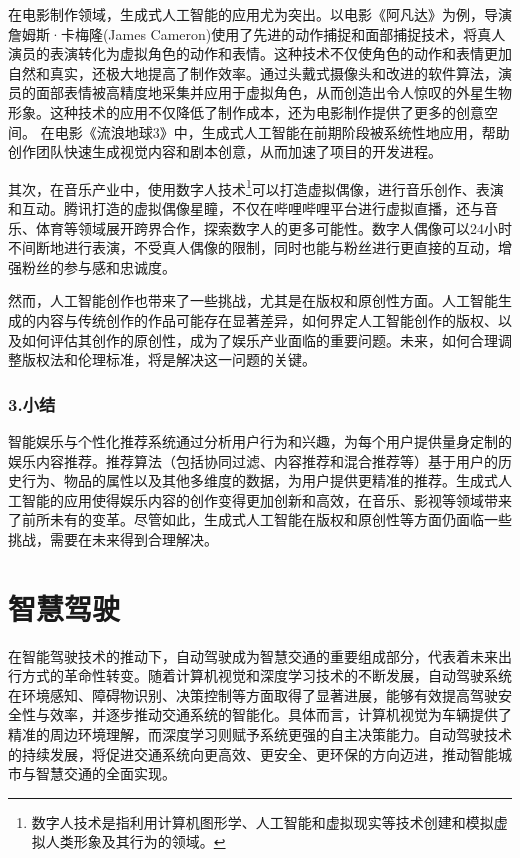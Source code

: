 在电影制作领域，生成式人工智能的应用尤为突出。以电影《阿凡达》为例，导演詹姆斯·卡梅隆(James Cameron)使用了先进的动作捕捉和面部捕捉技术，将真人演员的表演转化为虚拟角色的动作和表情。这种技术不仅使角色的动作和表情更加自然和真实，还极大地提高了制作效率。通过头戴式摄像头和改进的软件算法，演员的面部表情被高精度地采集并应用于虚拟角色，从而创造出令人惊叹的外星生物形象。这种技术的应用不仅降低了制作成本，还为电影制作提供了更多的创意空间。
在电影《流浪地球3》中，生成式人工智能在前期阶段被系统性地应用，帮助创作团队快速生成视觉内容和剧本创意，从而加速了项目的开发进程。

其次，在音乐产业中，使用数字人技术\footnote{数字人技术是指利用计算机图形学、人工智能和虚拟现实等技术创建和模拟虚拟人类形象及其行为的领域。}可以打造虚拟偶像，进行音乐创作、表演和互动。腾讯打造的虚拟偶像星瞳，不仅在哔哩哔哩平台进行虚拟直播，还与音乐、体育等领域展开跨界合作，探索数字人的更多可能性。数字人偶像可以24小时不间断地进行表演，不受真人偶像的限制，同时也能与粉丝进行更直接的互动，增强粉丝的参与感和忠诚度。

然而，人工智能创作也带来了一些挑战，尤其是在版权和原创性方面。人工智能生成的内容与传统创作的作品可能存在显著差异，如何界定人工智能创作的版权、以及如何评估其创作的原创性，成为了娱乐产业面临的重要问题。未来，如何合理调整版权法和伦理标准，将是解决这一问题的关键。

\subsubsection{3.小结}

智能娱乐与个性化推荐系统通过分析用户行为和兴趣，为每个用户提供量身定制的娱乐内容推荐。推荐算法（包括协同过滤、内容推荐和混合推荐等）基于用户的历史行为、物品的属性以及其他多维度的数据，为用户提供更精准的推荐。生成式人工智能的应用使得娱乐内容的创作变得更加创新和高效，在音乐、影视等领域带来了前所未有的变革。尽管如此，生成式人工智能在版权和原创性等方面仍面临一些挑战，需要在未来得到合理解决。


\section{智慧驾驶}

在智能驾驶技术的推动下，自动驾驶成为智慧交通的重要组成部分，代表着未来出行方式的革命性转变。随着计算机视觉和深度学习技术的不断发展，自动驾驶系统在环境感知、障碍物识别、决策控制等方面取得了显著进展，能够有效提高驾驶安全性与效率，并逐步推动交通系统的智能化。具体而言，计算机视觉为车辆提供了精准的周边环境理解，而深度学习则赋予系统更强的自主决策能力。自动驾驶技术的持续发展，将促进交通系统向更高效、更安全、更环保的方向迈进，推动智能城市与智慧交通的全面实现。

